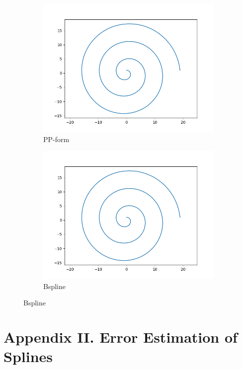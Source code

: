 \documentclass[a4paper]{article}
\begin{document}
\begin{figure}[H]
\begin{subfigure}[b]{0.45\textwidth}
        \includegraphics[width=\textwidth]{../figure/E_2_cum_PP160.png}
        \caption{PP-form}
    \end{subfigure}
    \begin{subfigure}[b]{0.45\textwidth}
        \centering
        \includegraphics[width=\textwidth]{../figure/E_2_cum_B160.png}
        \caption{Bspline}
    \end{subfigure}
\end{figure}


\section{Appendix II. Error Estimation of Splines}
\end{document}
